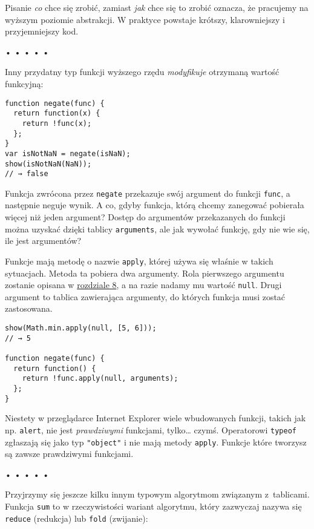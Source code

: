   
Pisanie \emph{co} chce się zrobić, zamiast \emph{jak} chce się to zrobić oznacza, że pracujemy na wyższym poziomie abstrakcji. W praktyce powstaje krótszy, klarowniejszy i przyjemniejszy kod.



\begin{center}
• • • • •
\end{center}

  
Inny przydatny typ funkcji wyższego rzędu \emph{modyfikuje} otrzymaną wartość funkcyjną:

  
\begin{verbatim} 
function negate(func) {
  return function(x) {
    return !func(x);
  };
}
var isNotNaN = negate(isNaN);
show(isNotNaN(NaN));
// → false
\end{verbatim}
  
Funkcja zwrócona przez \texttt{negate} przekazuje swój argument do funkcji \texttt{func}, a następnie neguje wynik. A co, gdyby funkcja, którą chcemy zanegować pobierała więcej niż jeden argument? Dostęp do argumentów przekazanych do funkcji można uzyskać dzięki tablicy \texttt{arguments}, ale jak wywołać funkcję, gdy nie wie się, ile jest argumentów?

  
Funkcje mają metodę o nazwie \texttt{apply}, której używa się właśnie w takich sytuacjach. Metoda ta pobiera dwa argumenty. Rola pierwszego argumentu zostanie opisana w \hyperref[chap:8]{rozdziale 8}, a na razie nadamy mu wartość \texttt{null}. Drugi argument to tablica zawierająca argumenty, do których funkcja musi zostać zastosowana.

  
\begin{verbatim} 
show(Math.min.apply(null, [5, 6]));
// → 5

function negate(func) {
  return function() {
    return !func.apply(null, arguments);
  };
}
\end{verbatim}
  
Niestety w przeglądarce Internet Explorer wiele wbudowanych funkcji, takich jak np. \texttt{alert}, nie jest \emph{prawdziwymi} funkcjami, tylko… czymś. Operatorowi \texttt{typeof} zgłaszają się jako typ \texttt{"object"} i nie mają metody \texttt{apply}. Funkcje które tworzysz są zawsze prawdziwymi funkcjami.



\begin{center}
• • • • •
\end{center}

  
Przyjrzymy się jeszcze kilku innym typowym algorytmom związanym z~tablicami. Funkcja \texttt{sum} to w rzeczywistości wariant algorytmu, który zazwyczaj nazywa się \texttt{reduce} (redukcja) lub \texttt{fold} (zwijanie):

